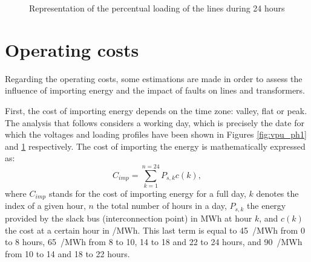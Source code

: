 \begin{figure}[!htb]\centering
{}
    \caption{Representation of the percentual loading of the lines during 24 hours}
    \label{fig:lines_ph1}
  \end{figure}


\clearpage
\newpage

\section{Operating costs}
Regarding the operating costs, some estimations are made in order to assess the influence of importing energy and the impact of faults on lines and transformers. 

First, the cost of importing energy depends on the time zone: valley, flat or peak. The analysis that follows considers a working day, which is precisely the date for which the voltages and loading profiles have been shown in Figures \ref{fig:vpu_ph1} and \ref{fig:lines_ph1} respectively. The cost of importing the energy is mathematically expressed as:
\begin{equation}
  C_{imp} = \sum_{k=1}^{n=24}P_{s,k} c(k),
  \label{eq:cimp}
\end{equation}
where $C_{imp}$ stands for the cost of importing energy for a full day, $k$ denotes the index of a given hour, $n$ the total number of hours in a day, $P_{s,k}$ the energy provided by the slack bus (interconnection point) in MWh at hour $k$, and $c(k)$ the cost at a certain hour in \texteuro/MWh. This last term is equal to 45~\texteuro/MWh from 0 to 8 hours, 65~\texteuro/MWh from 8 to 10, 14 to 18 and 22 to 24 hours, and 90~\texteuro/MWh from 10 to 14 and 18 to 22 hours. 

